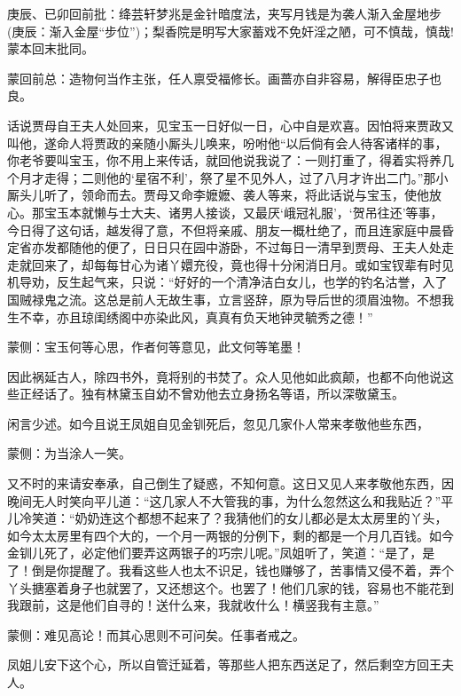 
\begin{parag}
    \begin{note}庚辰、已卯回前批：绛芸轩梦兆是金针暗度法，夹写月钱是为袭人渐入金屋地步(庚辰：渐入金屋“步位”)；梨香院是明写大家蓄戏不免奸淫之陋，可不慎哉，慎哉!蒙本回末批同。\end{note}
\end{parag}


\begin{parag}
    \begin{note}蒙回前总：造物何当作主张，任人禀受福修长。画蔷亦自非容易，解得臣忠子也良。\end{note}
\end{parag}


\begin{parag}
    话说贾母自王夫人处回来，见宝玉一日好似一日，心中自是欢喜。因怕将来贾政又叫他，遂命人将贾政的亲随小厮头儿唤来，吩咐他“以后倘有会人待客诸样的事，你老爷要叫宝玉，你不用上来传话，就回他说我说了：一则打重了，得着实将养几个月才走得；二则他的‘星宿不利’，祭了星不见外人，过了八月才许出二门。”那小厮头儿听了，领命而去。贾母又命李嬷嬷、袭人等来，将此话说与宝玉，使他放心。那宝玉本就懒与士大夫、诸男人接谈，又最厌‘峨冠礼服’，‘贺吊往还’等事，今日得了这句话，越发得了意，不但将亲戚、朋友一概杜绝了，而且连家庭中晨昏定省亦发都随他的便了，日日只在园中游卧，不过每日一清早到贾母、王夫人处走走就回来了，却每每甘心为诸丫嬛充役，竟也得十分闲消日月。或如宝钗辈有时见机导劝，反生起气来，只说：“好好的一个清净洁白女儿，也学的钓名沽誉，入了国贼禄鬼之流。这总是前人无故生事，立言竖辞，原为导后世的须眉浊物。不想我生不幸，亦且琼闺绣阁中亦染此风，真真有负天地钟灵毓秀之德！”\begin{note}蒙侧：宝玉何等心思，作者何等意见，此文何等笔墨！\end{note}因此祸延古人，除四书外，竟将别的书焚了。众人见他如此疯颠，也都不向他说这些正经话了。独有林黛玉自幼不曾劝他去立身扬名等语，所以深敬黛玉。
\end{parag}


\begin{parag}
    闲言少述。如今且说王凤姐自见金钏死后，忽见几家仆人常来孝敬他些东西，\begin{note}蒙侧：为当涂人一笑。\end{note}又不时的来请安奉承，自己倒生了疑惑，不知何意。这日又见人来孝敬他东西，因晚间无人时笑向平儿道：“这几家人不大管我的事，为什么忽然这么和我贴近？”平儿冷笑道：“奶奶连这个都想不起来了？我猜他们的女儿都必是太太房里的丫头，如今太太房里有四个大的，一个月一两银的分例下，剩的都是一个月几百钱。如今金钏儿死了，必定他们要弄这两银子的巧宗儿呢。”凤姐听了，笑道：“是了，是了！倒是你提醒了。我看这些人也太不识足，钱也赚够了，苦事情又侵不着，弄个丫头搪塞着身子也就罢了，又还想这个。也罢了！他们几家的钱，容易也不能花到我跟前，这是他们自寻的！送什么来，我就收什么！横竖我有主意。”\begin{note}蒙侧：难见高论！而其心思则不可问矣。任事者戒之。\end{note}凤姐儿安下这个心，所以自管迁延着，等那些人把东西送足了，然后剩空方回王夫人。
\end{parag}


